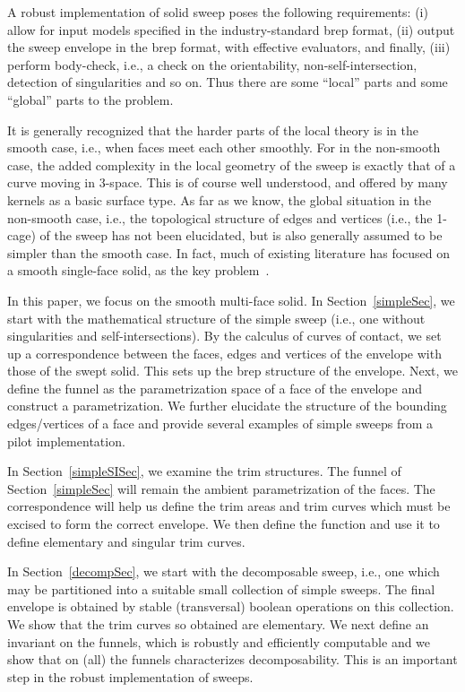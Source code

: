 \documentclass{elsart5p}
\begin{document}
A robust implementation of solid sweep poses the following
requirements: (i) allow for input models specified in the
industry-standard brep format, (ii) output the sweep envelope in the brep
format, with effective evaluators,
and finally, (iii) perform body-check, i.e., a check on the orientability,
non-self-intersection, detection of singularities and so on.
Thus there are some ``local'' parts and some ``global'' parts to the
problem.

It is
generally recognized that the harder parts of the local theory is in the
smooth case,
i.e., when faces meet each other smoothly.
For in the non-smooth case, the added complexity in the 
local geometry of the sweep is exactly that of a curve moving in 3-space.
This
is of course well understood, and offered by many kernels as a basic surface
type. As far as we know, the global situation in the non-smooth case, i.e.,
the topological structure of edges and
vertices (i.e., the 1-cage) of the sweep has not been elucidated, but is
also generally assumed
to be simpler than the smooth case.
In fact, much of existing literature has focused on a smooth single-face
solid, as the key problem~\cite{jacobian, sede, trimming}.



In this paper, we focus on the smooth multi-face
solid. In Section~\ref{simpleSec}, we start with the mathematical
structure of the simple sweep (i.e., one without singularities and
self-intersections). By the calculus of curves of contact, we set up a
correspondence between the faces, edges and vertices of
the envelope with those of the swept solid. This sets up the brep structure
of the envelope. Next, we define the funnel as the parametrization space
of a face of the envelope and construct a parametrization. We further elucidate
the structure of the bounding edges/vertices of a face and provide several examples 
of simple sweeps from a pilot implementation.

In Section~\ref{simpleSISec}, we examine the trim structures. The funnel 
of Section~\ref{simpleSec} will remain the ambient parametrization of the faces. 
The correspondence will help us define the trim areas and trim curves which 
must be excised to form the correct envelope. We then define the function  
and use it to define elementary and singular trim curves.

In Section~\ref{decompSec}, we start with the decomposable sweep, i.e., one
which may be partitioned into
a suitable small collection of simple sweeps. The final envelope is obtained
by stable (transversal) boolean operations on this collection. We show that
the trim curves so obtained are elementary. We next define an invariant
 on the funnels, which is robustly and efficiently computable
and we show that  on (all) the funnels characterizes decomposability.
This is an important step in the robust implementation of sweeps.
\end{document}
